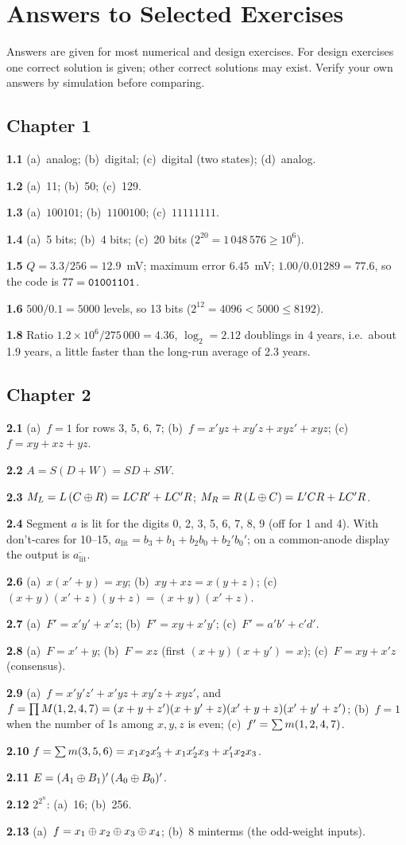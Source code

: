 \chapter{Answers to Selected Exercises}\label{app:answers}

Answers are given for most numerical and design exercises. For design exercises one correct solution is given; other correct solutions may exist. Verify your own answers by simulation before comparing.

\newcommand{\ans}[1]{\par\noindent\textbf{#1}\enspace}

\section*{Chapter 1}
\ans{1.1} (a)~analog; (b)~digital; (c)~digital (two states); (d)~analog.
\ans{1.2} (a)~11; (b)~50; (c)~129.
\ans{1.3} (a)~$100101$; (b)~$1100100$; (c)~$11111111$.
\ans{1.4} (a)~5 bits; (b)~4 bits; (c)~20 bits ($2^{20}=1\,048\,576\ge10^6$).
\ans{1.5} $Q=3.3/256=12.9$~mV; maximum error $6.45$~mV; $1.00/0.01289=77.6$, so the code is $77=\mathtt{01001101}$.
\ans{1.6} $500/0.1=5000$ levels, so 13 bits ($2^{12}=4096<5000\le8192$).
\ans{1.8} Ratio $1.2\times10^{6}/275\,000=4.36$, $\log_2=2.12$ doublings in 4 years, i.e.\ about 1.9 years, a little faster than the long-run average of 2.3 years.

\section*{Chapter 2}
\ans{2.1} (a)~$f=1$ for rows 3, 5, 6, 7; (b)~$f=x'yz+xy'z+xyz'+xyz$; (c)~$f=xy+xz+yz$.
\ans{2.2} $A=S(D+W)=SD+SW$.
\ans{2.3} $M_L=L\,(C\oplus R)=LCR'+LC'R$; $M_R=R\,(L\oplus C)=L'CR+LC'R$.
\ans{2.4} Segment $a$ is lit for the digits 0, 2, 3, 5, 6, 7, 8, 9 (off for 1 and 4). With don't-cares for 10--15, $a_{\mathrm{lit}}=b_3+b_1+b_2b_0+b_2'b_0'$; on a common-anode display the output is $\overline{a_{\mathrm{lit}}}$.
\ans{2.6} (a)~$x(x'+y)=xy$; (b)~$xy+xz=x(y+z)$; (c)~$(x+y)(x'+z)(y+z)=(x+y)(x'+z)$.
\ans{2.7} (a)~$F'=x'y'+x'z$; (b)~$F'=xy+x'y'$; (c)~$F'=a'b'+c'd'$.
\ans{2.8} (a)~$F=x'+y$; (b)~$F=xz$ (first $(x+y)(x+y')=x$); (c)~$F=xy+x'z$ (consensus).
\ans{2.9} (a)~$f=x'y'z'+x'yz+xy'z+xyz'$, and $f=\prod M(1,2,4,7)=(x+y+z')(x+y'+z)(x'+y+z)(x'+y'+z')$; (b)~$f=1$ when the number of 1s among $x,y,z$ is even; (c)~$f'=\sum m(1,2,4,7)$.
\ans{2.10} $f=\sum m(3,5,6)=x_1x_2x_3'+x_1x_2'x_3+x_1'x_2x_3$.
\ans{2.11} $E=(A_1\oplus B_1)'\,(A_0\oplus B_0)'$.
\ans{2.12} $2^{2^n}$: (a)~16; (b)~256.
\ans{2.13} (a)~$f=x_1\oplus x_2\oplus x_3\oplus x_4$; (b)~8 minterms (the odd-weight inputs).

